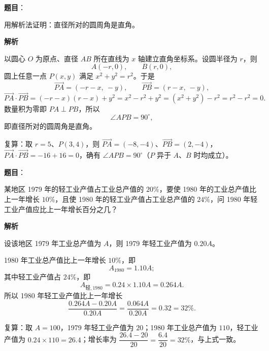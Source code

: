 \begin{answer}

\textbf{题目}：

用解析法证明：直径所对的圆周角是直角。

\textbf{解析}

以圆心 $O$ 为原点、直径 $AB$ 所在直线为 $x$ 轴建立直角坐标系。设圆半径为 $r$，则
\nopagebreak[4]
\[
A(-r,0),\qquad B(r,0),
\]
圆上任意一点 $P(x,y)$ 满足 $x^2+y^2=r^2$。于是
\nopagebreak[4]
\[
\overrightarrow{PA}=(-r-x,\ -y),\qquad \overrightarrow{PB}=(r-x,\ -y),
\]
\nopagebreak[4]
\[
\overrightarrow{PA}\cdot\overrightarrow{PB}=(-r-x)(r-x)+y^2=x^2-r^2+y^2=(x^2+y^2)-r^2=r^2-r^2=0.
\]
数量积为零即 $PA\perp PB$，所以
\nopagebreak[4]
\[
\angle APB=90^\circ,
\]
即直径所对的圆周角是直角。

复算：取 $r=5$、$P(3,4)$，则 $\overrightarrow{PA}=(-8,-4)$、$\overrightarrow{PB}=(2,-4)$，$\overrightarrow{PA}\cdot\overrightarrow{PB}=-16+16=0$，确有 $\angle APB=90^\circ$（$P$ 异于 $A$、$B$ 时均成立）。


\end{answer}
\begin{answer}

\textbf{题目}：

某地区 1979 年的轻工业产值占工业总产值的 $20\%$，要使 1980 年的工业总产值比上一年增长 $10\%$，且使 1980 年的轻工业产值占工业总产值的 $24\%$，问 1980 年轻工业产值应比上一年增长百分之几？

\textbf{解析}

设该地区 1979 年工业总产值为 $A$，则 1979 年轻工业产值为 $0.20A$。

1980 年工业总产值比上一年增长 $10\%$，即
\nopagebreak[4]
\[
A_{1980}=1.10A;
\]
其中轻工业产值占 $24\%$，即
\nopagebreak[4]
\[
A_{\text{轻},1980}=0.24\times1.10A=0.264A.
\]
所以 1980 年轻工业产值比上一年增长
\nopagebreak[4]
\[
\frac{0.264A-0.20A}{0.20A}=\frac{0.064A}{0.20A}=0.32=32\%.
\]

复算：取 $A=100$，1979 年轻工业产值为 $20$；1980 年工业总产值为 $110$，轻工业产值为 $0.24\times110=26.4$；增长率为 $\dfrac{26.4-20}{20}=\dfrac{6.4}{20}=32\%$，与上式一致。


\end{answer}
